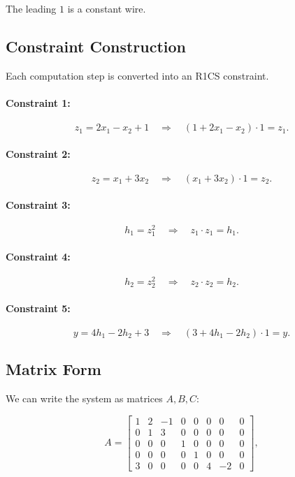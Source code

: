 The leading $1$ is a constant wire.

\subsection{Constraint Construction}

Each computation step is converted into an R1CS constraint.

\paragraph{Constraint 1:}
\[
z_1 = 2x_1 - x_2 + 1
\quad \Rightarrow \quad
(1 + 2x_1 - x_2)\cdot 1 = z_1.
\]

\paragraph{Constraint 2:}
\[
z_2 = x_1 + 3x_2
\quad \Rightarrow \quad
(x_1 + 3x_2)\cdot 1 = z_2.
\]

\paragraph{Constraint 3:}
\[
h_1 = z_1^2
\quad \Rightarrow \quad
z_1 \cdot z_1 = h_1.
\]

\paragraph{Constraint 4:}
\[
h_2 = z_2^2
\quad \Rightarrow \quad
z_2 \cdot z_2 = h_2.
\]

\paragraph{Constraint 5:}
\[
y = 4h_1 - 2h_2 + 3
\quad \Rightarrow \quad
(3 + 4h_1 - 2h_2)\cdot 1 = y.
\]

\subsection{Matrix Form}

We can write the system as matrices $A, B, C$:

\[
A =
\begin{bmatrix}
1 & 2 & -1 & 0 & 0 & 0 & 0 & 0 \\
0 & 1 & 3 & 0 & 0 & 0 & 0 & 0 \\
0 & 0 & 0 & 1 & 0 & 0 & 0 & 0 \\
0 & 0 & 0 & 0 & 1 & 0 & 0 & 0 \\
3 & 0 & 0 & 0 & 0 & 4 & -2 & 0
\end{bmatrix},
\]

